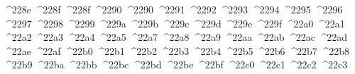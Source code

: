 {  ^^^^228e%
  ^^^^228f%
  ^^^^228f%
  ^^^^2290%
  ^^^^2290%
  ^^^^2291%
  ^^^^2292%
  ^^^^2293%
  ^^^^2294%
  ^^^^2295%
  ^^^^2296%
  ^^^^2297%
  ^^^^2298%
  ^^^^2299%
  ^^^^229a%
  ^^^^229b%
  ^^^^229c%
  ^^^^229d%
  ^^^^229e%
  ^^^^229f%
  ^^^^22a0%
  ^^^^22a1%
  ^^^^22a2%
  ^^^^22a3%
  ^^^^22a4%
  ^^^^22a5%
  ^^^^22a7%
  ^^^^22a8%
  ^^^^22a9%
  ^^^^22aa%
  ^^^^22ab%
  ^^^^22ac%
  ^^^^22ad%
  ^^^^22ae%
  ^^^^22af%
  ^^^^22b0%
  ^^^^22b1%
  ^^^^22b2%
  ^^^^22b3%
  ^^^^22b4%
  ^^^^22b5%
  ^^^^22b6%
  ^^^^22b7%
  ^^^^22b8%
  ^^^^22b9%
  ^^^^22ba%
  ^^^^22bb%
  ^^^^22bc%
  ^^^^22bd%
  ^^^^22be%
  ^^^^22bf%
  ^^^^22c0%
  ^^^^22c1%
  ^^^^22c2%
  ^^^^22c3%
}
